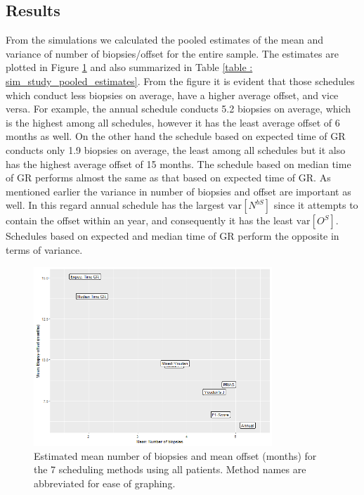 \subsection{Results}
From the simulations we calculated the pooled estimates of the mean and variance of number of biopsies/offset for the entire sample. The estimates are plotted in Figure \ref{fig : meanNbVsOffset} and also summarized in Table \ref{table : sim_study_pooled_estimates}. From the figure it is evident that those schedules which conduct less biopsies on average, have a higher average offset, and vice versa. For example, the annual schedule conducts 5.2 biopsies on average, which is the highest among all schedules, however it has the least average offset of 6 months as well. On the other hand the schedule based on expected time of GR conducts only 1.9 biopsies on average, the least among all schedules but it also has the highest average offset of 15 months. The schedule based on median time of GR performs almost the same as that based on expected time of GR. As mentioned earlier the variance in number of biopsies and offset are important as well. In this regard annual schedule has the largest $\mbox{var}[N^{bS}]$ since it attempts to contain the offset within an year, and consequently it has the least $\mbox{var}[O^S]$. Schedules based on expected and median time of GR perform the opposite in terms of variance.

\begin{figure}[!htb]
	\centering
    \captionsetup{justification=centering}
	\includegraphics[width=0.8\textwidth]{images/sim_study/meanNbVsOffset_all.png}
	\caption{Estimated mean number of biopsies and mean offset (months) for the 7 scheduling methods using all patients. Method names are abbreviated for ease of graphing.}
	\label{fig : meanNbVsOffset}
\end{figure}

